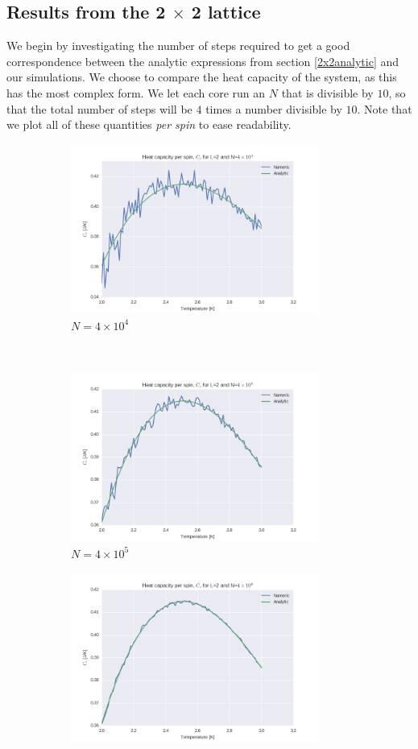 \documentclass[a4paper, 10pt]{article}
\begin{document}
\subsection{Results from the 2 $\times$ 2 lattice}
We begin by investigating the number of steps required to get a good correspondence between the analytic expressions from section \ref{2x2analytic} and our simulations. We choose to compare the heat capacity of the system, as this has the most complex form. We let each core run an $N$ that is divisible by $10$, so that the total number of steps will be $4$ times a number divisible by $10$. Note that we plot all of these quantities \textit{per spin} to ease readability.
\begin{figure}[!ht]
    \centering
    \begin{subfigure}[H!]{0.5\textwidth}
        \centering
        \includegraphics[height=2.2in]{L2Cv4e4.png}
        \caption{$N=4\times 10^4$}
    \end{subfigure}%
    ~ 
    \begin{subfigure}[H!]{0.5\textwidth}
        \centering
        \includegraphics[height=2.2in]{L2Cv4e5.png}
        \caption{$N=4\times 10^5$}
    \end{subfigure}
    \begin{subfigure}[H!]{0.5\textwidth}
        \centering
        \includegraphics[height=2.2in]{L2Cv4e6.png}

\end{subfigure}
\end{figure}
\end{document}
